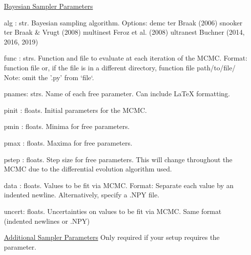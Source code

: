 \documentclass[letterpaper, 12pt]{article}
\begin{document}
\noindent \underline{Bayesian Sampler Parameters}
\item alg   : str.  Bayesian sampling algorithm.  Options:
                      demc                 ter Braak (2006)
                      snooker      ter Braak & Vrugt (2008)
                      multinest         Feroz et al. (2008)
                      ultranest              Buchner (2014, 2016, 2019)
\item func  : strs. Function and file to evaluate at each iteration of 
                    the MCMC.
                    Format: 
                      function file
                    or, if the file is in a different directory,
                      function file path/to/file/
                    Note: omit the '.py' from `file`.
\item pnames: strs. Name of each free parameter. Can include LaTeX 
                    formatting.
\item pinit : floats. Initial parameters for the MCMC.
\item pmin  : floats. Minima for free parameters.
\item pmax  : floats. Maxima for free parameters.
\item pstep : floats. Step size for free parameters. 
                      This will change throughout the MCMC due to the 
                      differential evolution algorithm used.
\item data  : floats. Values to be fit via MCMC. 
                    Format: Separate each value by an indented newline.
                    Alternatively, specify a .NPY file.
\item uncert: floats. Uncertainties on values to be fit via MCMC. 
                      Same format (indented newlines or .NPY)


\noindent \underline{Additional Sampler Parameters}
Only required if your setup requires the parameter.
\end{document}
